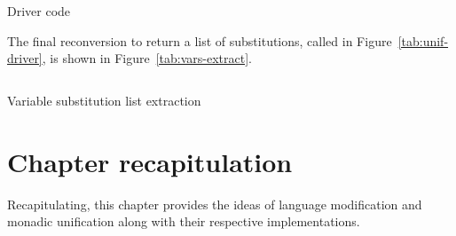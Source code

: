 \documentclass[thesis-solanki.tex]{subfiles}
\begin{document}
\begin{code-list}[H]
  \begin{singlespace}
    \inputminted[linenos]{haskell}{haskell-proto1-unify-driver.hs}
  \end{singlespace}
  \caption{Driver code}
  \label{tab:unif-driver}
\end{code-list}


The final reconversion to return a list of substitutions, called  in
Figure~\ref{tab:unif-driver}, is shown in Figure~\ref{tab:vars-extract}.
\begin{code-list}[H]
  \begin{singlespace}
    \inputminted[linenos]{haskell}{haskell-proto1-unify-out.hs}
  \end{singlespace}
  \caption{Variable substitution list extraction}
  \label{tab:vars-extract}
\end{code-list}

\section{Chapter recapitulation}
Recapitulating, this chapter provides the ideas of language modification and monadic unification along with their
respective implementations.


\ifMain\ifDraft
\begin{scope}
  \nolinenumbers
  \enotesize
  \par
  \begin{singlespace}
  \setlength{\parskip}{12pt plus 2pt minus 1pt}
  \theendnotes
  \par
  \end{singlespace}
\end{scope}
\fi\fi
\end{document}
